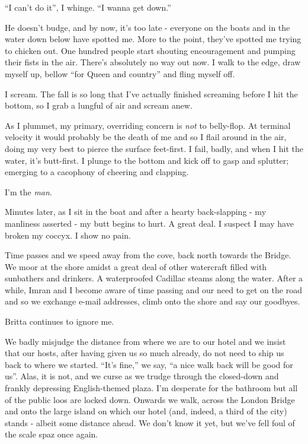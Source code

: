 \documentclass[a5paper,titlepage,11pt]{book}
\begin{document}
``I can't do it'', I whinge. ``I wanna get down.''

He doesn't budge, and by now, it's too late - everyone on the boats and in the water down below have spotted me. More to the point, they've spotted me trying to chicken out. One hundred people start shouting encouragement and pumping their fists in the air. There's absolutely no way out now. I walk to the edge, draw myself up, bellow ``for Queen and country'' and fling myself off.

I scream. The fall is so long that I've actually finished screaming before I hit the bottom, so I grab a lungful of air and scream anew.

As I plummet, my primary, overriding concern is \emph{not} to belly-flop. At terminal velocity it would probably be the death of me and so I flail around in the air, doing my very best to pierce the surface feet-first. I fail, badly, and when I hit the water, it's butt-first. I  plunge to the bottom and kick off to gasp and splutter; emerging to a cacophony of cheering and clapping.

I'm the \emph{man}.

Minutes later, as I sit in the boat and after a hearty back-slapping - my manliness asserted - my butt begins to hurt. A great deal. I suspect I may have broken my coccyx. I show no pain.

Time passes and we speed away from the cove, back north towards the Bridge. We moor at the shore amidst a great deal of other watercraft filled with sunbathers and drinkers. A waterproofed Cadillac steams along the water. After a while, Imran and I become aware of time passing and our need to get on the road and so we exchange e-mail addresses, climb onto the shore and say our goodbyes.

Britta continues to ignore me.

We badly misjudge the distance from where we are to our hotel and we insist that our hosts, after having given us so much already, do not need to ship us back to where we started. ``It's fine,'' we say, ``a nice walk back will be good for us''. Alas, it is not, and we curse as we trudge through the closed-down and frankly depressing English-themed plaza. I'm desperate for the bathroom but all of the public loos are locked down. Onwards we walk, across the London Bridge and onto the large island on which our hotel (and, indeed, a third of the city) stands - albeit some distance ahead. We don't know it yet, but we've fell foul of the scale spaz once again.
\end{document}
